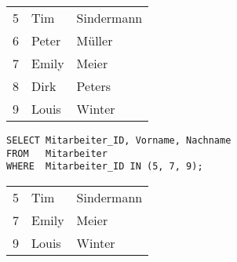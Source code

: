 \begin{center}
    \begin{small}
        \tablehead{}
        \begin{msoraclesql}
            \begin{supertabular}{rll}
                5 & Tim & Sindermann \\
                6 & Peter & Müller \\
                7 & Emily & Meier \\
                8 & Dirk & Peters \\
                9 & Louis & Winter \\
            \end{supertabular}
        \end{msoraclesql}
    \end{small}
\end{center}
\begin{lstlisting}[language=oracle_sql,caption={Alle Zeilen aus einer Wertemenge anzeigen},label=sql02_05]
SELECT Mitarbeiter_ID, Vorname, Nachname
FROM   Mitarbeiter
WHERE  Mitarbeiter_ID IN (5, 7, 9);
          \end{lstlisting}
\begin{center}
    \begin{small}
        \tablehead{}
        \begin{msoraclesql}
            \begin{supertabular}{rll}
                5 & Tim & Sindermann \\
                7 & Emily & Meier \\
                9 & Louis & Winter \\
            \end{supertabular}
        \end{msoraclesql}
    \end{small}
\end{center}
\clearpage
